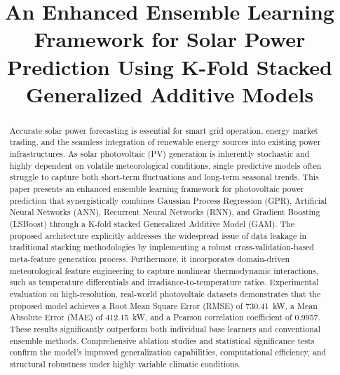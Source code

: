 \documentclass[conference]{IEEEtran}
\begin{document}
\title{
An Enhanced Ensemble Learning Framework for Solar Power Prediction Using K-Fold Stacked Generalized Additive Models
}

\author{
}

\maketitle


\begin{abstract}
Accurate solar power forecasting is essential for smart grid operation, energy market trading, and the seamless integration of renewable energy sources into existing power infrastructures. As solar photovoltaic (PV) generation is inherently stochastic and highly dependent on volatile meteorological conditions, single predictive models often struggle to capture both short-term fluctuations and long-term seasonal trends. This paper presents an enhanced ensemble learning framework for photovoltaic power prediction that synergistically combines Gaussian Process Regression (GPR), Artificial Neural Networks (ANN), Recurrent Neural Networks (RNN), and Gradient Boosting (LSBoost) through a K-fold stacked Generalized Additive Model (GAM). The proposed architecture explicitly addresses the widespread issue of data leakage in traditional stacking methodologies by implementing a robust cross-validation-based meta-feature generation process. Furthermore, it incorporates domain-driven meteorological feature engineering to capture nonlinear thermodynamic interactions, such as temperature differentials and irradiance-to-temperature ratios. Experimental evaluation on high-resolution, real-world photovoltaic datasets demonstrates that the proposed model achieves a Root Mean Square Error (RMSE) of 730.41~kW, a Mean Absolute Error (MAE) of 412.15~kW, and a Pearson correlation coefficient of 0.9957. These results significantly outperform both individual base learners and conventional ensemble methods. Comprehensive ablation studies and statistical significance tests confirm the model's improved generalization capabilities, computational efficiency, and structural robustness under highly variable climatic conditions.
\end{abstract}
\end{document}

